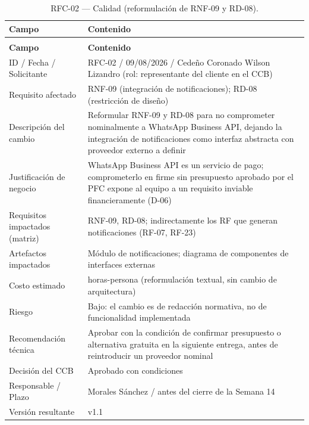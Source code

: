 \documentclass[journal,onecolumn]{IEEEtran}
\makeatletter
\newenvironment{atributos}[2]{%
	\small
	\begin{longtable}{@{}>{\raggedright\arraybackslash}p{4.2cm} >{\raggedright\arraybackslash}p{11.2cm}@{}}
		\caption{#2}\label{tab:#1}\\
		\toprule
		\textbf{Campo} & \textbf{Contenido} \\
		\midrule
		\endfirsthead
		\multicolumn{2}{@{}l}{\small\itshape (continuación)}\\
		\toprule
		\textbf{Campo} & \textbf{Contenido} \\
		\midrule
		\endhead
		\bottomrule
		\endlastfoot
	}{%
	\end{longtable}
	\normalsize
}
\makeatother
\begin{document}
	\begin{atributos}{rfc-02}{RFC-02 --- Calidad (reformulación de RNF-09 y RD-08).}
		ID / Fecha / Solicitante & RFC-02 / 09/08/2026 / Cedeño Coronado Wilson Lizandro (rol: representante del cliente en el CCB) \\
		Requisito afectado & RNF-09 (integración de notificaciones); RD-08 (restricción de diseño) \\
		Descripción del cambio & Reformular RNF-09 y RD-08 para no comprometer nominalmente a WhatsApp Business API, dejando la integración de notificaciones como interfaz abstracta con proveedor externo a definir \\
		Justificación de negocio & WhatsApp Business API es un servicio de pago; comprometerlo en firme sin presupuesto aprobado por el PFC expone al equipo a un requisito inviable financieramente (D-06) \\
		Requisitos impactados (matriz) & RNF-09, RD-08; indirectamente los RF que generan notificaciones (RF-07, RF-23) \\
		Artefactos impactados & Módulo de notificaciones; diagrama de componentes de interfaces externas \\
		Costo estimado & 3 horas-persona (reformulación textual, sin cambio de arquitectura) \\
		Riesgo & Bajo: el cambio es de redacción normativa, no de funcionalidad implementada \\
		Recomendación técnica & Aprobar con la condición de confirmar presupuesto o alternativa gratuita en la siguiente entrega, antes de reintroducir un proveedor nominal \\
		Decisión del CCB & Aprobado con condiciones \\
		Responsable / Plazo & Morales Sánchez / antes del cierre de la Semana 14 \\
		Versión resultante & v1.1 \\
	\end{atributos}
	
\end{document}
